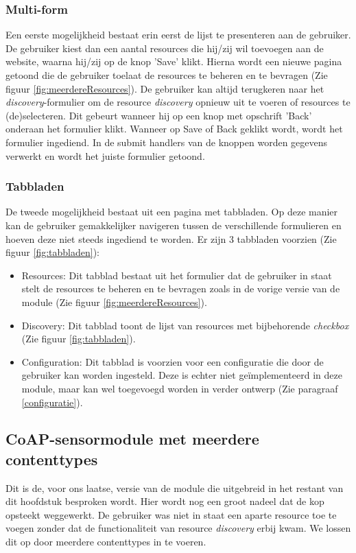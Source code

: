 \subsubsection{Multi-form}
Een eerste mogelijkheid bestaat erin eerst de lijst te presenteren aan de gebruiker. De gebruiker kiest dan een aantal resources die hij/zij wil toevoegen aan de website, waarna hij/zij op de knop 'Save' klikt. Hierna wordt een nieuwe pagina getoond die de gebruiker toelaat de resources te beheren en te bevragen (Zie figuur \ref{fig:meerdereResources}). De gebruiker kan altijd terugkeren naar het \textit{discovery}-formulier om de resource \textit{discovery} opnieuw uit te voeren of resources te (de)selecteren. Dit gebeurt wanneer hij op een knop met opschrift 'Back' onderaan het formulier klikt. Wanneer op Save of Back geklikt wordt, wordt het formulier ingediend. In de submit handlers van de knoppen worden gegevens verwerkt en wordt het juiste formulier getoond.

\subsubsection{Tabbladen}
De tweede mogelijkheid bestaat uit een pagina met tabbladen. Op deze manier kan de gebruiker gemakkelijker navigeren tussen de verschillende formulieren en hoeven deze niet steeds ingediend te worden. Er zijn 3 tabbladen voorzien (Zie figuur \ref{fig:tabbladen}):
\begin{itemize}
\item Resources: Dit tabblad bestaat uit het formulier dat de gebruiker in staat stelt de resources te beheren en te bevragen zoals in de vorige versie van de module (Zie figuur \ref{fig:meerdereResources}).
\item Discovery: Dit tabblad toont de lijst van resources met bijbehorende \textit{checkbox} (Zie figuur \ref{fig:tabbladen}).
\item Configuration: Dit tabblad is voorzien voor een configuratie die door de gebruiker kan worden ingesteld. Deze is echter niet ge\"{i}mplementeerd in deze module, maar kan wel toegevoegd worden in verder ontwerp (Zie paragraaf \ref{configuratie}).
\end{itemize}

\subsection{CoAP-sensormodule met meerdere contenttypes}
Dit is de, voor ons laatse, versie van de module die uitgebreid in het restant van dit hoofdstuk besproken wordt. Hier wordt nog een groot nadeel dat de kop opsteekt weggewerkt. De gebruiker was niet in staat een aparte resource toe te voegen zonder dat de functionaliteit van resource \textit{discovery} erbij kwam. We lossen dit op door meerdere contenttypes in te voeren.

